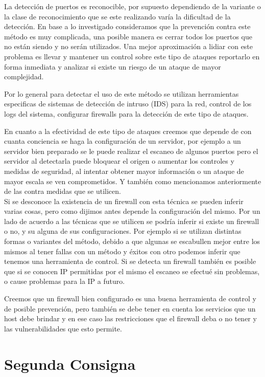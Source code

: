 \documentclass[a4paper]{article}
\begin{document}
La detección de puertos es reconocible, por supuesto dependiendo de la variante o la clase de reconocimiento que se este realizando varía la dificultad de la detección. En base a lo investigado 
consideramos que la prevención contra este método es muy complicada, una posible manera es cerrar todos los puertos que no están siendo y no serán utilizados. Una mejor aproximación a lidiar con este
problema es llevar y mantener un control sobre este tipo de ataques reportarlo en forma inmediata y analizar si existe un riesgo de un ataque de mayor complejidad.

Por lo general para detectar el uso de este método se utilizan herramientas especificas de sistemas de detección de intruso (IDS) para la red, control de los logs del sistema, configurar firewalls para la
detección de este tipo de ataques.

En cuanto a la efectividad de este tipo de ataques creemos que depende de con cuanta conciencia se haga la configuración de  un servidor, por ejemplo a un servidor bien preparado se le puede realizar
el escaneo de algunos puertos pero el servidor al detectarla puede bloquear el origen o aumentar los controles y medidas de seguridad, al intentar obtener mayor información o un ataque de mayor escala se ven
comprometidos. Y también como mencionamos anteriormente de las contra medidas que se utilicen.\\

Si se desconoce la existencia de un firewall con esta técnica se pueden inferir varias cosas, pero como dijimos antes depende la configuración del mismo. Por un lado de acuerdo a las técnicas que se
utilicen se podría inferir si existe un firewall o no, y su alguna de sus configuraciones. Por ejemplo si se utilizan distintas formas o variantes del método, debido a que algunas se escabullen mejor entre
los mismos al tener fallas con un método y éxitos con otro podemos inferir que tenemos una herramienta de control. Si se detecta un firewall también es posible que si se conocen IP permitidas por
el mismo el escaneo se efectué sin problemas, o cause problemas para la IP a futuro.

Creemos que un firewall bien configurado es una buena herramienta de control y de posible prevención, pero también se debe tener en cuenta los servicios que un host debe brindar y en ese caso las
restricciones que el firewall deba o no tener y las vulnerabilidades que esto permite.

\newpage
\section{Segunda Consigna}
\end{document}
